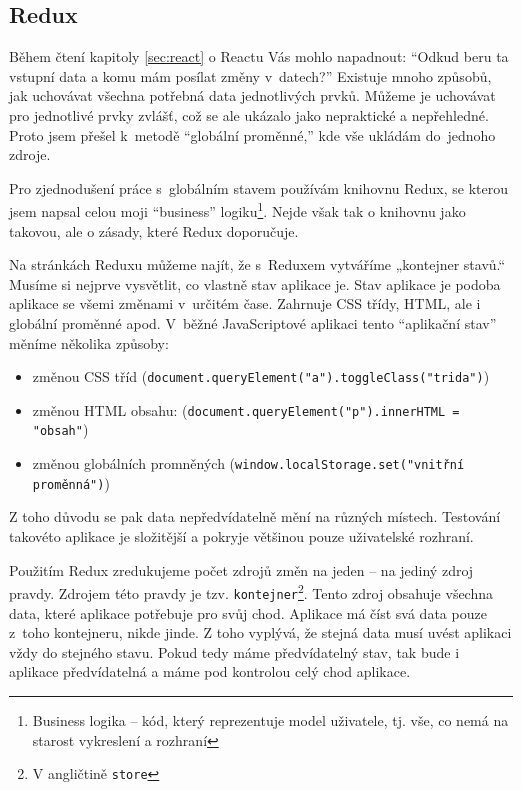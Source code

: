 \documentclass[a4paper,11pt,oneside]{article}
\begin{document}
\subsection{Redux}

Během čtení kapitoly \ref{sec:react} o Reactu Vás mohlo napadnout: \enquote{Odkud beru ta vstupní data a komu mám posílat změny v~datech?} Existuje mnoho způsobů, jak uchovávat všechna potřebná data jednotlivých prvků. Můžeme je uchovávat pro jednotlivé prvky zvlášť, což se ale ukázalo jako nepraktické a nepřehledné. Proto jsem přešel k~metodě \enquote{globální proměnné,} kde vše ukládám do~jednoho zdroje.

Pro zjednodušení práce s~globálním stavem používám knihovnu Redux, se kterou jsem napsal celou moji \enquote{business} logiku\footnote{Business logika -- kód, který reprezentuje model uživatele, tj. vše, co nemá na starost vykreslení a rozhraní}. Nejde však tak o knihovnu jako takovou, ale o zásady, které Redux doporučuje.

Na stránkách Reduxu můžeme najít, že s~Reduxem vytváříme „kontejner stavů.“ Musíme si nejprve vysvětlit, co vlastně stav aplikace je. Stav aplikace je podoba aplikace se všemi změnami v~určitém čase. Zahrnuje CSS třídy, HTML, ale i globální proměnné apod. V~běžné JavaScriptové aplikaci tento \enquote{aplikační stav} měníme několika způsoby:

\begin{itemize}
	\item změnou CSS tříd (\lstinline|document.queryElement("a").toggleClass("trida")|)
	\item změnou HTML obsahu: (\lstinline|document.queryElement("p").innerHTML = "obsah"|)
	\item změnou globálních promněných (\lstinline|window.localStorage.set("vnitřní proměnná")|)
\end{itemize}

Z toho důvodu se pak data nepředvídatelně mění na různých místech. Testování takovéto aplikace je složitější a pokryje většinou pouze uživatelské rozhraní. 

Použitím Redux zredukujeme počet zdrojů změn na jeden -- na jediný zdroj pravdy. Zdrojem této pravdy je tzv. \lstinline|kontejner|\footnote{V angličtině \lstinline|store|}. Tento zdroj obsahuje všechna data, které aplikace potřebuje pro svůj chod. Aplikace má číst svá data pouze z~toho kontejneru, nikde jinde. Z toho vyplývá, že stejná data musí uvést aplikaci vždy do stejného stavu. Pokud tedy máme předvídatelný stav, tak bude i aplikace předvídatelná a máme pod kontrolou celý chod aplikace.
\end{document}

